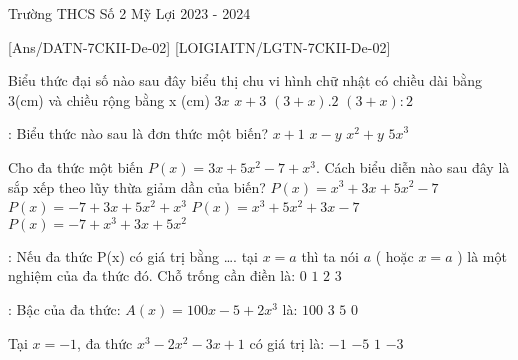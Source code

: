 \begin{name}{Trường THCS Số 2 Mỹ Lợi }{2023 - 2024}
\end{name}
[Ans/DATN-7CKII-De-02]
{}
[LOIGIAITN/LGTN-7CKII-De-02]
\begin{ex}[NB-TN1] Biểu thức đại số nào sau đây biểu thị chu vi hình chữ nhật có chiều dài bằng 3(cm) và chiều rộng bằng x (cm)
	\choice
	{\True $3x$}
	{$x+3$}
	{$(3+x).2$}
	{$(3+x): 2$}
	\loigiai{}
\end{ex}

\begin{ex}[NB-TN2]: Biểu thức nào sau là đơn thức một biến?
	\choice
	{$x+1$}
	{$x-y$}
	{\True $x^2+y$}
	{${5x}^3$}
	\loigiai{}
\end{ex}

\begin{ex}[NB-TN3] Cho đa thức một biến $P(x)=3x+5x^2-7+x^3$. Cách biểu diễn nào sau đây là sắp xếp theo lũy thừa giảm dần của biến?
	\choice
	{$P(x)=x^3+3x+5x^2-7$}
	{$P(x)=-7+3x+5x^2+x^3$}
	{\True $P(x)=x^3+5x^2+3x-7$}
	{$P(x)=-7+x^3+3x+5x^2$}
	\loigiai{}
\end{ex}

\begin{ex}[NB-TN4]: Nếu đa thức P(x) có giá trị bằng {\ldots}. tại $x=a$ thì ta nói $a$ ( hoặc $x=a$ ) là một nghiệm của đa thức đó. Chỗ trống cần điền là:
	\choice
	{$0$}
	{$1$}
	{\True $2$}
	{$3$}
	\loigiai{}
\end{ex}

\begin{ex}[TH-TN 11]: Bậc của đa thức: $A(x)=100x-5+2x^3$ là:
	\choice
	{$100$}
	{\True $3$}
	{$5$}
	{$0$}
	\loigiai{}
\end{ex}

\begin{ex}[VD-TN 12]Tại $ x=-1$, đa thức $x^3-2x^2-3x+1$ có giá trị là:
	\choice
	{$-1$}
	{$-5$}
	{\True $1$}
	{$-3$}
	\loigiai{}
\end{ex}

